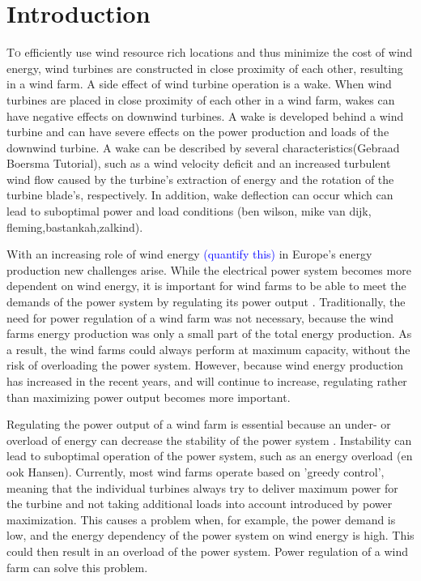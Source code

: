 \section{Introduction}
\lettrine[nindent=0em,lines=3]To efficiently use wind resource rich locations and thus minimize the cost of wind energy, wind turbines are constructed in close proximity of each other, resulting in a wind farm. A side effect of wind turbine operation is a wake. When wind turbines are placed in close proximity of each other in a wind farm, wakes can have negative effects on downwind turbines. A wake is developed behind a wind turbine and can have severe effects on the power production and loads of the downwind turbine. A wake can be described by several characteristics(Gebraad Boersma Tutorial), such as a wind velocity deficit and an increased turbulent wind flow caused by the turbine's extraction of energy and the rotation of the turbine blade's, respectively. In addition, wake deflection can occur which can lead to suboptimal power and load conditions (ben wilson, mike van dijk, fleming,bastankah,zalkind).

With an increasing role of wind energy \textcolor{blue}{(quantify this)} in Europe's energy production new challenges arise\cite{Nat2016}. While the electrical power system becomes more dependent on wind energy, it is important for wind farms to be able to meet the demands of the power system by regulating its power output \cite{Tande2003}. Traditionally, the need for power regulation of a wind farm was not necessary, because the wind farms energy production was only a small part of the total energy production. As a result, the wind farms could always perform at maximum capacity, without the risk of overloading the power system. However, because wind energy production has increased in the recent years, and will continue to increase, regulating rather than maximizing power output becomes more important.

Regulating the power output of a wind farm is essential because an under- or overload of energy can decrease the stability of the power system \cite{Tande2003}. Instability can lead to suboptimal operation of the power system, such as an energy overload \cite{Tande2003}(en ook Hansen). Currently, most wind farms operate based on 'greedy control', meaning that the individual turbines always try to deliver maximum power for the turbine and not taking additional loads into account introduced by power maximization. This causes a problem when, for example, the power demand is low, and the energy dependency of the power system on wind energy is high. This could then result in an overload of the power system. Power regulation of a wind farm can solve this problem.

